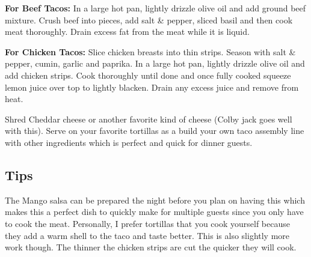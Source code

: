 \tab \textbf{For Beef Tacos:} In a large hot pan, lightly drizzle olive oil and add ground beef mixture. Crush beef into pieces, add salt \& pepper, sliced basil and then cook meat thoroughly. Drain excess fat from the meat while it is liquid. 

\tab \textbf{For Chicken Tacos:} Slice chicken breasts into thin strips. Season with salt \& pepper, cumin, garlic and paprika. In a large hot pan, lightly drizzle olive oil and add chicken strips.  Cook thoroughly until done and once fully cooked squeeze lemon juice over top to lightly blacken. Drain any excess juice and remove from heat.

\tab Shred Cheddar cheese or another favorite kind of cheese (Colby jack goes well with this). Serve on your favorite tortillas as a build your own taco assembly line with other ingredients which is perfect and quick for dinner guests.

\subsection*{Tips}

The Mango salsa can be prepared the night before you plan on having this which makes this a perfect dish to quickly make for multiple guests since you only have to cook the meat. Personally, I prefer tortillas that you cook yourself because they add a warm shell to the taco and taste better. This is also slightly more work though. The thinner the chicken strips are cut the quicker they will cook. 